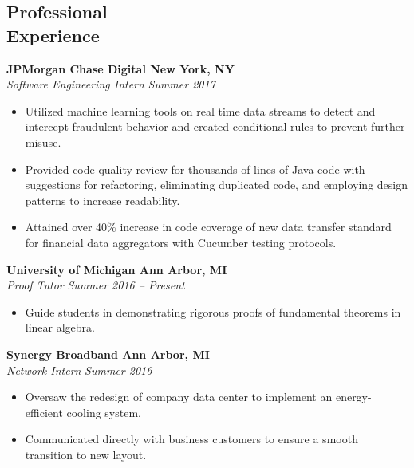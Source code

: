 \documentclass[margin,line]{resume}
\begin{document}
\begin{resume}
\sectionbreak
\vspace{-2.5mm}
    \section{\mysidestyle Professional\\Experience}

    \textbf{JPMorgan Chase Digital \hfill New York, NY} \\\vspace{1mm}%
    \textsl{Software Engineering Intern} \hfill \textsl{Summer 2017}
    \begin{itemize}
    \item Utilized machine learning tools on real time data streams to detect and intercept fraudulent behavior and created conditional rules to prevent further misuse. 
    \item Provided code quality review for thousands of lines of Java code with suggestions for refactoring, eliminating duplicated code, and employing design patterns to increase readability.
    \item Attained over 40\% increase in code coverage of new data transfer standard for financial data aggregators with Cucumber testing protocols.
    \end{itemize}

    \vspace{-2.5mm}
    \textbf{University of Michigan \hfill Ann Arbor, MI} \\\vspace{1mm}%
    \textsl{Proof Tutor} \hfill \textsl{Summer 2016 -- Present}
    \begin{itemize}
    \item Guide students in demonstrating rigorous proofs of fundamental theorems in linear algebra.
    \end{itemize}

    \vspace{-2.5mm}
    \textbf{Synergy Broadband \hfill Ann Arbor, MI} \\\vspace{1mm}%
    \textsl{Network Intern} \hfill \textsl{Summer 2016}
    \begin{itemize}
    \item Oversaw the redesign of company data center to implement an energy-efficient cooling system.
    \item Communicated directly with business customers to ensure a smooth transition to new layout. 
    \end{itemize}


\end{resume}
\end{document}
